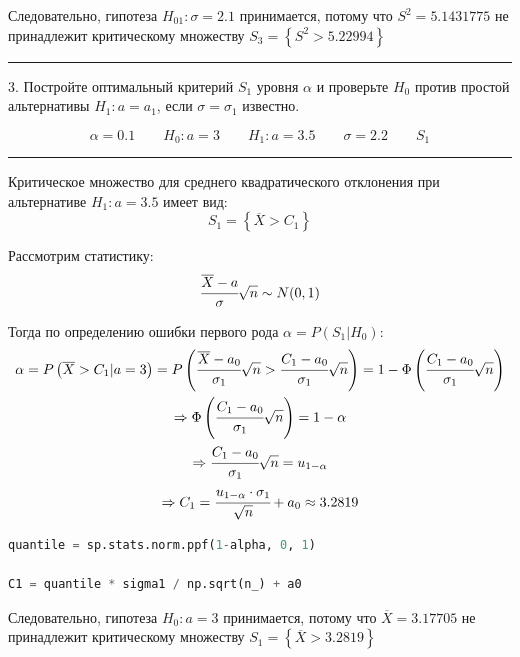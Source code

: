 \documentclass[a4paper, 14pt]{extarticle}
\begin{document}
Следовательно, гипотеза $H_{01}: \sigma = 2.1$ принимается, потому что $S^2 = 5.1431775$ 
не принадлежит критическому множеству $S_3 = \left\{ S^2 > 5.22994 \right\}$

\rule{\linewidth}{0.1mm}

3. Постройте оптимальный критерий $S_1$ уровня $\alpha$ и проверьте $H_0$ против простой 
альтернативы $H_1: a = a_1$, если $\sigma = \sigma_1$ известно.

\begin{equation*}
    \alpha = 0.1 \qquad H_{0}: a = 3 \qquad H_1: a = 3.5 \qquad \sigma = 2.2 \qquad S_1
\end{equation*}

\rule{\linewidth}{0.1mm}

Критическое множество для среднего квадратического отклонения при альтернативе $H_1: a = 3.5$ 
имеет вид:
\begin{equation*}
    S_1 = \left\{ \overline{X} > C_1 \right\}
\end{equation*}

Рассмотрим статистику:
\begin{equation*}
    \cfrac{\overline{X} - a}{\sigma}\sqrt{n} \sim N(0, 1)
\end{equation*}

Тогда по определению ошибки первого рода $\alpha = P(S_1|H_0)$:
\begin{gather*}
    \alpha = P\left(\overline{X} > C_1 | a = 3\right) = 
    P\left( \cfrac{\overline{X} - a_0}{\sigma_1} \sqrt{n} > 
    \cfrac{C_1 - a_0}{\sigma_1} \sqrt{n} \right)
    = 1 - \Phi\left(\cfrac{C_1 - a_0}{\sigma_1} \sqrt{n}\right) \\
    \Rightarrow \Phi\left( \cfrac{C_1 - a_0}{\sigma_1} \sqrt{n} \right) = 1 - \alpha \\
    \Rightarrow \cfrac{C_1 - a_0}{\sigma_1} \sqrt{n} = u_{1 - \alpha} \\
    \Rightarrow C_1 = \cfrac{u_{1 - \alpha} \cdot \sigma_1}{\sqrt{n}} + a_0 \approx 3.2819 
\end{gather*}

\begin{center}
    \begin{lstlisting}[language=Python]
quantile = sp.stats.norm.ppf(1-alpha, 0, 1)

C1 = quantile * sigma1 / np.sqrt(n_) + a0
    \end{lstlisting}
\end{center}

Следовательно, гипотеза $H_{0}: a = 3$ принимается, потому что $\overline{X} = 3.17705$ не 
принадлежит критическому множеству $S_1 = \left\{ \overline{X} > 3.2819 \right\}$
\end{document}
